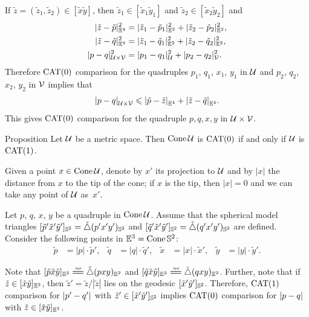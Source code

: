 If $\tilde z=(\tilde z_1,\tilde z_2)\in [\tilde x\tilde y]$, then $\tilde z_1\in [\tilde x_1\tilde y_1]$ and $\tilde z_2\in [\tilde x_2\tilde y_2]$ and
\begin{align*}
\dist[2]{\tilde z}{\tilde p}{\EE^4}&=\dist[2]{\tilde z_1}{\tilde p_1}{\EE^2}+\dist[2]{\tilde z_2}{\tilde p_2}{\EE^2},
\\
\dist[2]{\tilde z}{\tilde q}{\EE^4}&=\dist[2]{\tilde z_1}{\tilde q_1}{\EE^2}+\dist[2]{\tilde z_2}{\tilde q_2}{\EE^2},
\\
\dist[2]{p}{q}{\spc{U}\times\spc{V}}&=\dist[2]{p_1}{q_1}{\spc{U}}+\dist[2]{p_2}{q_2}{\spc{V}}.
\end{align*}
Therefore $\mathrm{CAT}(0)$ comparison for the quadruples $p_1$, $q_1$, $x_1$, $y_1$ in $\mathcal{U}$
and 
$p_2$, $q_2$, $x_2$, $y_2$ in $\mathcal{V}$ implies that
\[\dist{p}{q}{\spc{U}\times\spc{V}}
\le
\dist{\tilde p}{\tilde z}{\EE^4}+\dist{\tilde z}{\tilde q}{\EE^4}.\]
This gives $\mathrm{CAT}(0)$ comparison for the quadruple $p,q,x,y$ in $\spc{U}\z\times \spc{V}$.
\qeds

\begin{thm}{Proposition}\label{ex:cone+susp}
Let $\mathcal{U}$ be a metric space.
Then $\mathop{\rm Cone}\nolimits\mathcal{U}$ is $\mathrm{CAT}(0)$ if and only if $\mathcal{U}$ is $\mathrm{CAT}(1)$.
\end{thm}

Given a point $x\in \mathop{\rm Cone}\nolimits\mathcal{U}$, denote by $x'$ its projection to $\mathcal{U}$
and by $|x|$ the distance from $x$ to the tip of the cone;
if $x$ is the tip, then $|x|=0$ and we can take any point of $\mathcal{U}$ as~$x'$.

Let $p$, $q$, $x$, $y$
be a quadruple in $\mathop{\rm Cone}\nolimits\mathcal{U}$.
Assume that the spherical model triangles $[\tilde p'\tilde x'\tilde y']_{\mathbb{S}^2}=\tilde\triangle(p'x'y')_{\mathbb{S}^2}$ and $[\tilde q'\tilde x'\tilde y']_{\mathbb{S}^2}=\tilde\triangle(q'x'y')_{\mathbb{S}^2}$ are defined.
Consider the following points in $\mathbb{E}^3=\mathop{\rm Cone}\nolimits\mathbb{S}^2$: 
\begin{align*}
\tilde p&=|p|\cdot\tilde p',
&
\tilde q&=|q|\cdot\tilde q',
&
\tilde x&=|x|\cdot\tilde x',
&
\tilde y&=|y|\cdot\tilde y'.
\end{align*}

Note that
$\trig{\tilde p}{\tilde x}{\tilde y}_{\EE^3}\iso\modtrig(pxy)_{\EE^2}$
and
$\trig{\tilde q}{\tilde x}{\tilde y}_{\EE^3}\iso\modtrig(qxy)_{\EE^2}$.
Further, note that if $\tilde z\in [\tilde x\tilde y]_{\mathbb{E}^3}$, then
$\tilde z'=\tilde z/|\tilde z|$ lies on the geodesic $[\tilde x'\tilde y']_{\mathbb{S}^2}$.
Therefore, $\mathrm{CAT}(1)$ comparison for $\dist{p'}{q'}{}$ with $\tilde z'\in[\tilde x'\tilde y']_{\mathbb{S}^2}$ implies
$\mathrm{CAT}(0)$ comparison for $\dist{p}{q}{}$ with $\tilde z\in[\tilde x\tilde y]_{\mathbb{E}^3}$.

